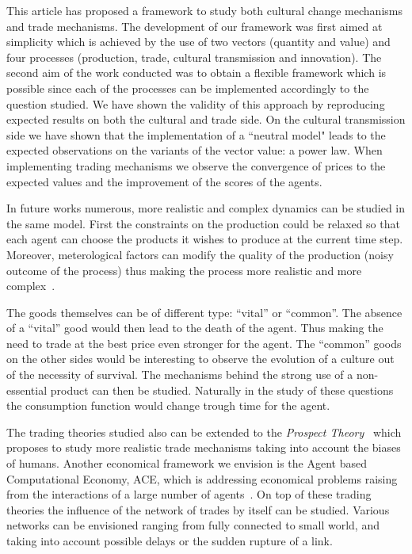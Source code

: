 \documentclass{wscpaperproc}
\begin{document}
This article has proposed a framework to study both cultural change mechanisms and trade mechanisms. The development of our framework was first aimed at simplicity which is achieved by the use of two vectors (quantity and value) and four processes (production, trade, cultural transmission and innovation). The second aim of the work conducted was to obtain a flexible framework which is possible since each of the processes can be implemented accordingly to the question studied. We have shown the validity of this approach by reproducing expected results on both the cultural and trade side. On the cultural transmission side we have shown that the implementation of a ``neutral model" leads to the expected observations on the variants of the vector value: a power law. When implementing trading mechanisms we observe the convergence of prices to the expected values and the improvement of the scores of the agents.

In future works numerous, more realistic and complex dynamics can be studied in the same model. First the constraints on the production could be relaxed so that each agent can choose the products it wishes to produce at the current time step. Moreover, meterological factors can modify the quality of the production (noisy outcome of the process) thus making the process more realistic and more complex~\cite{bentley_specialisation_2005}.

The goods themselves can be of different type: ``vital'' or ``common''. The absence of a ``vital'' good would then lead to the death of the agent. Thus making the need to trade at the best price even stronger for the agent. The ``common'' goods on the other sides would be interesting to observe the evolution of a culture out of the necessity of survival. The mechanisms behind the strong use of a non-essential product can then be studied. Naturally in the study of these questions the consumption function would change trough time for the agent.

The trading theories studied also can be extended to the \emph{Prospect Theory}~\cite{kahneman_prospect_1979} which proposes to study more realistic trade mechanisms taking into account the biases of humans. Another economical framework we envision is the Agent based Computational Economy, ACE, which is  addressing economical problems raising from the interactions of a large number of agents~\cite{tesfatsion_introduction_2001}. On top of these trading theories the influence of the network of trades by itself can be studied. Various networks can be envisioned ranging from fully connected to small world, and taking into account possible delays or the sudden rupture of a link.
\end{document}
